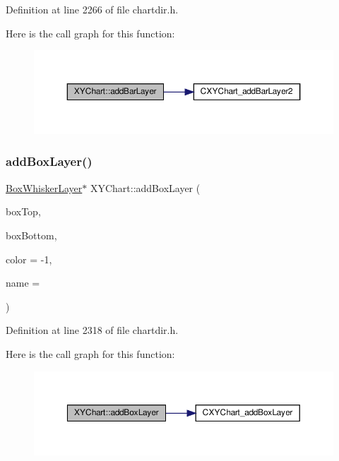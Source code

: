 Definition at line 2266 of file chartdir.\+h.

Here is the call graph for this function\+:
\nopagebreak
\begin{figure}[H]
\begin{center}
\leavevmode
\includegraphics[width=350pt]{class_x_y_chart_a9d98cdb1c6a4c83bc5d9ebc697f15450_cgraph}
\end{center}
\end{figure}
\mbox{\label{class_x_y_chart_aebd2b49d3385ac147314eabcd87ebf9c}} 
\subsubsection{\texorpdfstring{add\+Box\+Layer()}{addBoxLayer()}}
{\footnotesize\ttfamily \hyperlink{class_box_whisker_layer}{Box\+Whisker\+Layer}$\ast$ X\+Y\+Chart\+::add\+Box\+Layer (\begin{DoxyParamCaption}\item[{\hyperlink{class_double_array}{Double\+Array}}]{box\+Top,  }\item[{\hyperlink{class_double_array}{Double\+Array}}]{box\+Bottom,  }\item[{int}]{color = {\ttfamily -\/1},  }\item[{const char $\ast$}]{name = {} }\end{DoxyParamCaption})\hspace{0.3cm}{\ttfamily [inline]}}



Definition at line 2318 of file chartdir.\+h.

Here is the call graph for this function\+:
\nopagebreak
\begin{figure}[H]
\begin{center}
\leavevmode
\includegraphics[width=350pt]{class_x_y_chart_aebd2b49d3385ac147314eabcd87ebf9c_cgraph}
\end{center}
\end{figure}
\mbox{\label{class_x_y_chart_ab1da3dced1b6702fb3e230f6d3a94a05}} 
